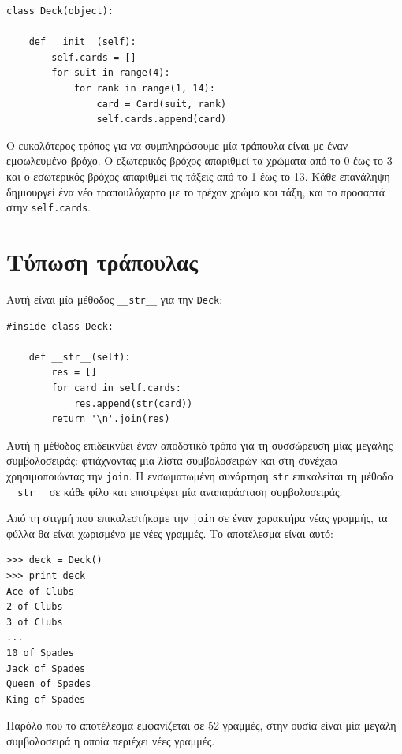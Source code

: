 \documentclass[10pt]{book}
\begin{document}
\begin{verbatim}
class Deck(object):

    def __init__(self):
        self.cards = []
        for suit in range(4):
            for rank in range(1, 14):
                card = Card(suit, rank)
                self.cards.append(card)
\end{verbatim}
%
Ο ευκολότερος τρόπος για να συμπληρώσουμε μία τράπουλα είναι με έναν εμφωλευμένο 
βρόχο. Ο εξωτερικός βρόχος απαριθμεί τα χρώματα από το 0 έως το 3 και ο εσωτερικός βρόχος 
απαριθμεί τις τάξεις από το 1 έως το 13. Κάθε επανάληψη δημιουργεί ένα νέο τραπουλόχαρτο 
με το τρέχον χρώμα και τάξη, και το προσαρτά στην {\tt self.cards}.


 
\section{Τύπωση τράπουλας}
\label{printdeck}

Αυτή είναι μία μέθοδος \verb"__str__" για την {\tt Deck}:

\begin{verbatim}
#inside class Deck:

    def __str__(self):
        res = []
        for card in self.cards:
            res.append(str(card))
        return '\n'.join(res)
\end{verbatim}
%
Αυτή η μέθοδος επιδεικνύει έναν αποδοτικό τρόπο για τη συσσώρευση μίας μεγάλης
συμβολοσειράς: φτιάχνοντας μία λίστα συμβολοσειρών και στη συνέχεια χρησιμοποιώντας την {\tt join}.
Η ενσωματωμένη συνάρτηση {\tt str} επικαλείται τη μέθοδο \verb"__str__" σε κάθε φίλο και επιστρέφει μία
αναπαράσταση συμβολοσειράς. 

Από τη στιγμή που επικαλεστήκαμε την {\tt join} σε έναν χαρακτήρα νέας γραμμής,
τα φύλλα θα είναι χωρισμένα με νέες γραμμές. Το αποτέλεσμα είναι αυτό:

\begin{verbatim}
>>> deck = Deck()
>>> print deck
Ace of Clubs
2 of Clubs
3 of Clubs
...
10 of Spades
Jack of Spades
Queen of Spades
King of Spades
\end{verbatim}
%
Παρόλο που το αποτέλεσμα εμφανίζεται σε 52 γραμμές, στην ουσία είναι μία μεγάλη συμβολοσειρά
η οποία περιέχει νέες γραμμές.
\end{document}

